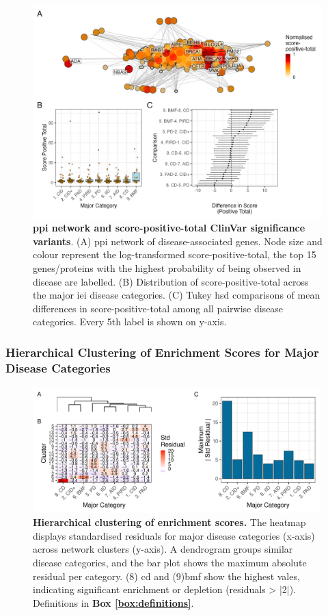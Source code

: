 \begin{figure}[ht]
  \centering
  \includegraphics[width=\textwidth]{../images/untangleR_ppi_network_assoc_patch1.jpg}
  \caption{\textbf{\ac{ppi} network and score-positive-total ClinVar significance variants}.
    (A) \ac{ppi} network of disease-associated genes. Node size and colour represent the log-transformed score-positive-total, the top 15 genes/proteins with the highest probability of being observed in disease are labelled.
    (B) Distribution of score-positive-total across the major \ac{iei} disease categories.
    (C) Tukey \ac{hsd} comparisons of mean differences in score-positive-total among all pairwise disease categories. Every 5th label is shown on y-axis.
  }
  \label{fig:ppi_network_assoc}
\end{figure}

\clearpage
\subsubsection{Hierarchical Clustering of Enrichment Scores for Major Disease Categories}

\begin{figure}[ht]
  \centering
  \includegraphics[width=0.99\textwidth]{../images/untangleR_ppi_network_patch2_cator.pdf}
  \caption{
   \textbf{Hierarchical clustering of enrichment scores.}
    The heatmap displays standardised residuals for major disease categories (x-axis) across network clusters (y-axis). A dendrogram groups similar disease categories, and the bar plot shows the maximum absolute residual per category.  (8) \ac{cd} and (9)\ac{bmf} show the highest vales, indicating significant enrichment or depletion (residuals > |2|). Definitions in \textbf{Box \ref{box:definitions}}.
  }
  \label{fig:patch2}
\end{figure}


